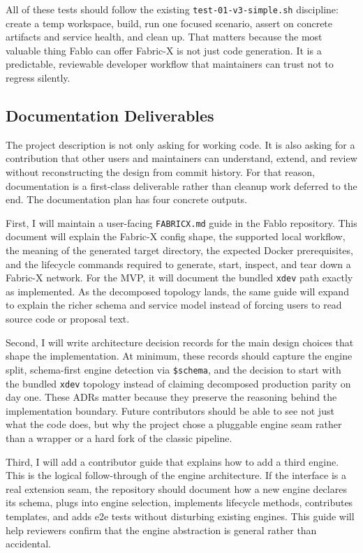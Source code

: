 All of these tests should follow the existing \texttt{test-01-v3-simple.sh} discipline: create a temp workspace, build, run one focused scenario, assert on concrete artifacts and service health, and clean up. That matters because the most valuable thing Fablo can offer Fabric-X is not just code generation. It is a predictable, reviewable developer workflow that maintainers can trust not to regress silently.

\subsection{Documentation Deliverables}

The project description is not only asking for working code. It is also asking for a contribution that other users and maintainers can understand, extend, and review without reconstructing the design from commit history. For that reason, documentation is a first-class deliverable rather than cleanup work deferred to the end. The documentation plan has four concrete outputs.

First, I will maintain a user-facing \texttt{FABRICX.md} guide in the Fablo repository. This document will explain the Fabric-X config shape, the supported local workflow, the meaning of the generated target directory, the expected Docker prerequisites, and the lifecycle commands required to generate, start, inspect, and tear down a Fabric-X network. For the MVP, it will document the bundled \texttt{xdev} path exactly as implemented. As the decomposed topology lands, the same guide will expand to explain the richer schema and service model instead of forcing users to read source code or proposal text.

Second, I will write architecture decision records for the main design choices that shape the implementation. At minimum, these records should capture the engine split, schema-first engine detection via \texttt{\$schema}, and the decision to start with the bundled \texttt{xdev} topology instead of claiming decomposed production parity on day one. These ADRs matter because they preserve the reasoning behind the implementation boundary. Future contributors should be able to see not just what the code does, but why the project chose a pluggable engine seam rather than a wrapper or a hard fork of the classic pipeline.

Third, I will add a contributor guide that explains how to add a third engine. This is the logical follow-through of the engine architecture. If the interface is a real extension seam, the repository should document how a new engine declares its schema, plugs into engine selection, implements lifecycle methods, contributes templates, and adds e2e tests without disturbing existing engines. This guide will help reviewers confirm that the engine abstraction is general rather than accidental.

